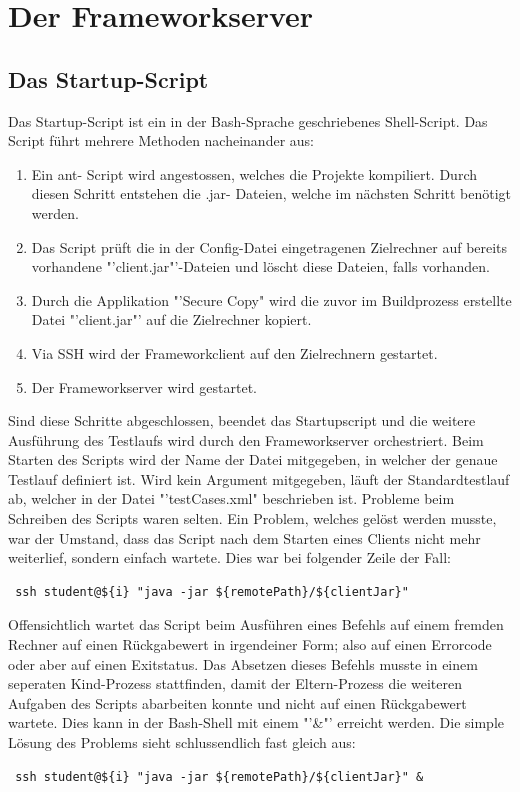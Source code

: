 \section{Der Frameworkserver}
\label{sec:test-FW Server}
\subsection{Das Startup-Script}
\label{sec:startupScript}
Das  Startup-Script ist ein in der Bash-Sprache geschriebenes Shell-Script. Das Script führt mehrere Methoden nacheinander aus:
\begin{enumerate}
\item Ein ant- Script wird an\-ge\-stos\-sen, wel\-ches die Pro\-jek\-te kom\-pi\-liert. Durch die\-sen Schritt ent\-stehen die .jar- Dateien, welche im nächs\-ten Schritt benötigt werden.
\item Das Script prüft die in der Config-\-Datei ein\-ge\-tra\-gen\-en Ziel\-rechner auf bereits vorhandene "'client.jar"'-Dateien und löscht diese Dateien, falls vorhanden.
\item Durch die Applikation "'Secure Copy" wird die zuvor im Buildprozess erstellte Datei "'client.jar"' auf die Zielrechner kopiert.
\item Via SSH wird der Frameworkclient auf den Zielrechnern gestartet.
\item Der Frameworkserver wird gestartet.
\end{enumerate}
Sind diese Schritte abgeschlossen, beendet das Startupscript und die weitere Ausführung des Testlaufs wird durch den Frameworkserver orchestriert.
Beim Starten des Scripts wird der Name der Datei mitgegeben, in welcher der genaue Testlauf definiert ist. Wird kein Argument mitgegeben, läuft der Standardtestlauf ab, welcher in der Datei "'testCases.xml" beschrieben ist.\newline
Probleme beim Schreiben des Scripts waren selten. Ein Problem, welches gelöst werden musste, war der Umstand, dass das Script nach dem Starten eines Clients nicht mehr weiterlief, sondern einfach wartete. Dies war bei folgender Zeile der Fall:
\begin{verbatim}
 ssh student@${i} "java -jar ${remotePath}/${clientJar}"
\end{verbatim}	
Offensichtlich wartet das Script beim Aus\-füh\-ren ei\-nes Be\-fehls auf ein\-em frem\-den Rech\-ner auf einen Rück\-ga\-be\-wert in irgendeiner Form; also auf einen Errorcode oder aber auf einen Exitstatus. Das Absetzen dieses Befehls musste in einem seperaten Kind-Prozess stattfinden, damit der Eltern-Prozess die weiteren Aufgaben des Scripts abarbeiten konnte und nicht auf einen Rückgabewert wartete. Dies kann in der Bash-Shell mit einem "'\&"' erreicht werden. Die simple Lösung des Problems sieht schlussendlich fast gleich aus:
\begin{verbatim}
 ssh student@${i} "java -jar ${remotePath}/${clientJar}" &
\end{verbatim}

